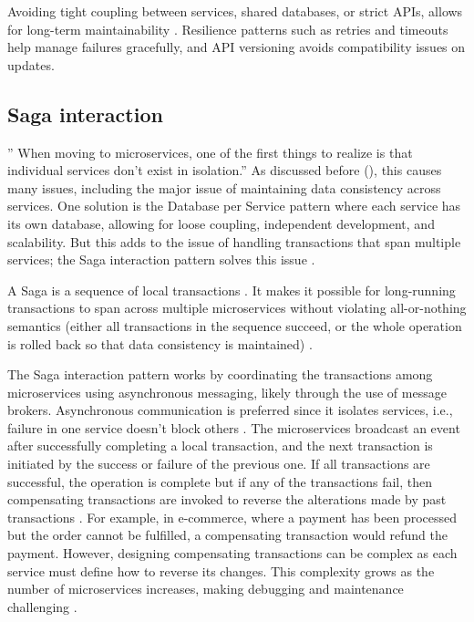 \documentclass[]{final}
\begin{document}
Avoiding tight coupling between services, shared databases, or strict
APIs, allows for long-term maintainability \cite{robbagby_microservice_nodate}. Resilience patterns
such as retries and timeouts help manage failures gracefully,
and API versioning avoids compatibility issues on updates.

\subsection{Saga interaction}

” When moving to microservices, one of the first things to realize is that
individual services don’t exist in isolation.”\cite{noauthor_saga_nodate} As discussed
before {\hypersetup{linkcolor=teal}(\pageref{microservice_issue})}, this causes
many issues, including the major issue of maintaining data consistency across
services. One solution is the Database per Service pattern where each service
has its own database, allowing for loose coupling, independent development,
and scalability. But this adds to the issue of handling transactions that span
multiple services; the Saga interaction pattern solves this issue \cite{noauthor_microservices_nodate}.

A Saga is a sequence of local transactions \cite{noauthor_microservices_nodate}.
It makes it possible for long-running transactions to span across multiple
microservices without violating all-or-nothing semantics (either all
transactions in the sequence succeed, or the whole operation is rolled back
so that data consistency is maintained) \cite{noauthor_saga_nodate}.

\label{saga_events}
The Saga interaction pattern works by coordinating the transactions among
microservices using asynchronous messaging, likely through the use of message
brokers. Asynchronous communication is preferred since it isolates services,
i.e., failure in one service doesn't block others \cite{noauthor_managing_nodate}.
The microservices
broadcast an event after successfully completing a local transaction, and
the next transaction is initiated by the success or failure of the
previous one. If all transactions are successful, the operation is complete
but if any of the transactions fail, then compensating transactions are
invoked to reverse the alterations made by past transactions \cite{noauthor_saga_nodateaws}.
For example, in e-commerce, where a payment has been processed but the order
cannot be fulfilled, a compensating transaction would refund the payment.
However, designing compensating transactions can be complex as each service
must define how to reverse its changes. This complexity grows as the number
of microservices increases, making debugging and maintenance challenging \cite{noauthor_saga_nodateaws}.
\end{document}
